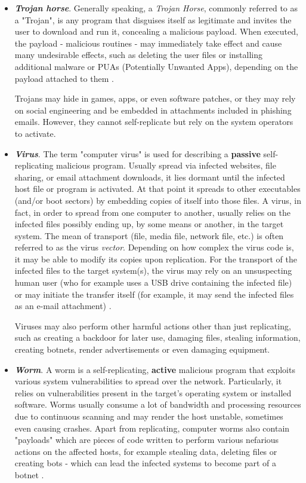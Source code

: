 \documentclass[pdfa%
,cucitura%
]{toptesi}
\begin{document}
\begin{itemize}
	\item \textbf{\textit{Trojan horse}}. Generally speaking, a \textit{Trojan Horse}, commonly referred to as a "Trojan", is any program that disguises itself as legitimate and invites the user to download and run it, concealing a malicious payload. When executed, the payload - malicious routines - may immediately take effect and cause many undesirable effects, such as deleting the user files or installing additional malware or PUAs (Potentially Unwanted Apps), depending on the payload attached to them \cite{NamanyaTWM}.
	
	Trojans may hide in games, apps, or even software patches, or they may rely on social engineering and be embedded in attachments included in phishing emails. However, they cannot self-replicate but rely on the system operators to activate.
	
	\item \textbf{\textit{Virus}}. The term "computer virus" is used for describing a \textbf{passive} self-replicating malicious program. Usually spread via infected websites, file sharing, or email attachment downloads, it lies dormant until the infected host file or program is activated. At that point it spreads to other executables (and/or boot sectors) by embedding copies of itself into those files. A virus, in fact, in order to spread from one computer to another, usually relies on the infected files possibly ending up, by some means or another, in the target system. The mean of transport (file, media file, network file, etc.) is often referred to as the virus \textit{vector}. Depending on how complex the virus code is, it may be able to modify its copies upon replication. For the transport of the infected files to the target system(s), the virus may rely on an unsuspecting human user (who for example uses a USB drive containing the infected file) or may initiate the transfer itself (for example, it may send the infected files as an e-mail attachment) \cite{SharpAIM}.
	
	Viruses may also perform other harmful actions other than just replicating, such as creating a backdoor for later use, damaging files, stealing information, creating botnets, render advertisements or even damaging equipment.
	
	\item \textbf{\textit{Worm}}. A worm is a self-replicating, \textbf{active} malicious program that exploits various system vulnerabilities to spread over the network. Particularly, it relies on vulnerabilities present in the target's operating system or installed software. Worms usually consume a lot of bandwidth and processing resources due to continuous scanning and may render the host unstable, sometimes even causing crashes. Apart from replicating, computer worms also contain "payloads"  which are pieces of code written to perform various nefarious actions on the affected hosts, for example stealing data, deleting files or creating bots - which can lead the infected systems to become part of a botnet \cite{NamanyaTWM}.
	
\end{itemize}
\end{document}
